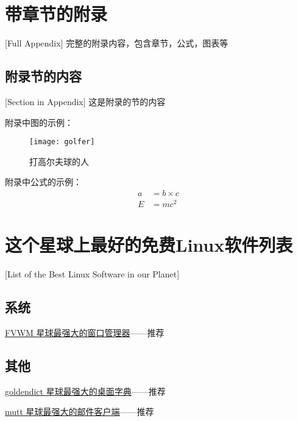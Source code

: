 \chapter{带章节的附录}[Full Appendix]%
完整的附录内容，包含章节，公式，图表等

\section{附录节的内容}[Section in Appendix]
这是附录的节的内容

附录中图的示例：
\begin{figure}[htbp]
\centering
\texttt{[image: golfer]}
\caption{\xiaosi[0]打高尔夫球的人}
\end{figure}

附录中公式的示例：
\begin{align}
a & = b \times c \\
E & = m c^2
\label{eq}
\end{align}

\chapter{这个星球上最好的免费Linux软件列表}[List of the Best Linux Software in our Planet]
\section*{系统}

\href{http://fvwm.org/}{FVWM 星球最强大的窗口管理器}——推荐

\section*{其他}

\href{https://github.com/goldendict/goldendict}{goldendict 星球最强大的桌面字典}——推荐

\href{http://www.mutt.org/}{mutt 星球最强大的邮件客户端}——推荐

